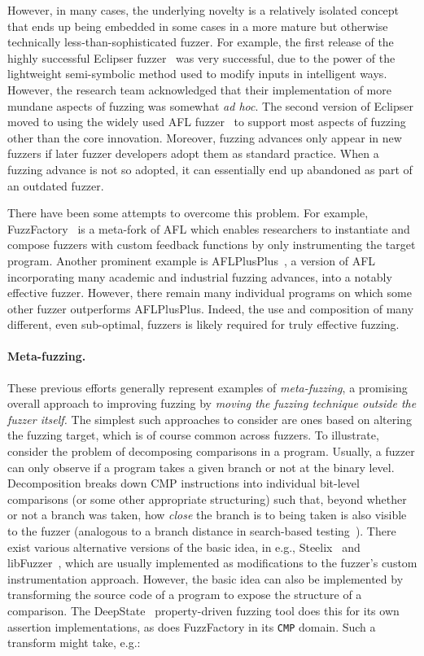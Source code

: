 However, in many cases,
the underlying novelty is a relatively isolated concept that ends up being 
embedded in some cases in a more mature but otherwise technically
less-than-sophisticated fuzzer.  For example, 
the first release of the highly successful Eclipser fuzzer~\cite{ref-fixme} was very successful, 
due to the power of the lightweight semi-symbolic method used to modify 
inputs in intelligent ways.  However, the research team acknowledged that their 
implementation of more mundane aspects of fuzzing was somewhat \emph{ad hoc}.  The 
second version of Eclipser moved to using the widely used AFL fuzzer~\cite{ref-fixme} to support 
most aspects of fuzzing other than the core innovation.  
%
Moreover, fuzzing advances only appear in new fuzzers 
if later fuzzer developers adopt them as standard practice. When a 
fuzzing advance is not so adopted, it can
essentially end up abandoned as part of an outdated fuzzer.   

There have been some attempts to overcome this problem. For example, 
FuzzFactory~\cite{fuzzfactory} is a meta-fork of AFL which enables researchers 
to instantiate and compose fuzzers with custom feedback functions by only 
instrumenting the target program. Another prominent example is AFLPlusPlus~\cite{ref-fixme}, a 
version of AFL incorporating many academic and industrial fuzzing advances, 
into a notably effective fuzzer.  However, there remain many individual 
programs on which some other fuzzer outperforms AFLPlusPlus. Indeed, the use and
composition of 
many different, even sub-optimal, fuzzers is likely required for truly 
effective fuzzing.

\paragraph{Meta-fuzzing.}
These previous efforts generally represent examples of 
\emph{meta-fuzzing}, a promising overall approach to improving fuzzing by 
\emph{moving the fuzzing technique outside the fuzzer itself.}  The simplest 
such approaches to consider are ones based on altering the fuzzing target, 
which is of course common across fuzzers. To illustrate, consider
the problem of decomposing comparisons in a program.  Usually, a fuzzer can only observe if a 
program takes a given branch or not at the binary level.  Decomposition breaks 
down CMP instructions into individual bit-level comparisons (or some other 
appropriate structuring) such that, beyond whether or not a branch was taken,
how \emph{close} the branch is to being taken is also visible to the fuzzer  (analogous to a branch 
distance in search-based testing~\cite{ref-fixme}).  There exist various alternative versions of 
the basic idea, in e.g., Steelix~\cite{ref-fixme} and
libFuzzer~\cite{ref-fixme}, which are usually implemented 
as modifications to the fuzzer's custom instrumentation approach.  However, the basic 
idea can also be implemented by transforming the source code of a program to 
expose the structure of a comparison.  The DeepState~\cite{ref-fixme} property-driven fuzzing 
tool does this for its own assertion implementations, as does FuzzFactory in 
its \texttt{CMP} domain.  Such a transform might take, e.g.:

